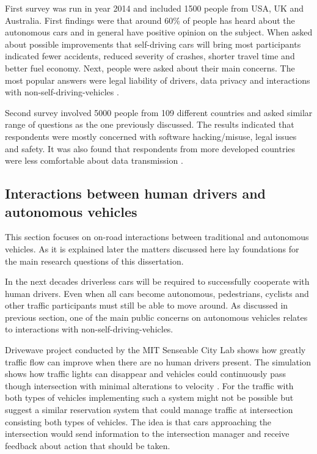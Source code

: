 \documentclass[11pt,english]{article}
\begin{document}
\par
First survey was run in year 2014 and included 1500 people from USA, UK and Australia. First findings were that around 60\% of people has heard about the autonomous cars and in general have positive opinion on the subject. When asked about possible improvements that self-driving cars will bring most participants indicated fewer accidents, reduced severity of crashes, shorter travel time and better fuel economy. Next, people were asked about their main concerns. The most popular answers were legal liability of drivers, data privacy and interactions with non-self-driving-vehicles \citep{schoettle2014survey}.


\par

Second survey involved 5000 people from 109 different countries and asked similar range of questions as the one previously discussed. The results indicated that respondents were mostly concerned with software hacking/misuse, legal issues and safety. It was also found that respondents from more developed countries were less comfortable about data transmission \citep{kyriakidis2015public}.



\subsection{Interactions between human drivers and autonomous vehicles}

This section focuses on on-road interactions between traditional and autonomous vehicles. As it is explained later the matters discussed here lay foundations for the main research questions of this dissertation.

\par
In the next decades driverless cars will be required to successfully cooperate with human drivers. Even when all cars become autonomous, pedestrians, cyclists and other traffic participants must still be able to move around. As discussed in previous section, one of the main public concerns on autonomous vehicles relates to interactions with non-self-driving-vehicles.

\par
Drivewave project conducted by the MIT Senseable City Lab shows how greatly traffic flow can improve when there are no human drivers present. The simulation shows how traffic lights can disappear and vehicles could continuously pass though intersection with minimal alterations to velocity \citep{drivewave}. For the traffic with both types of vehicles implementing such a system might not be possible but \citet{dresner2007sharing} suggest a similar reservation system that could manage traffic at intersection consisting both types of vehicles. The idea is that cars approaching the intersection would send information to the intersection manager and receive feedback about action that should be taken.
\end{document}
